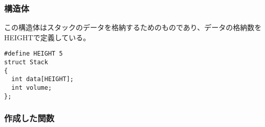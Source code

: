 \documentclass[dvipdfmx]{jsarticle}
\begin{document}
\subsubsection{構造体}
この構造体はスタックのデータを格納するためのものであり、データの格納数をHEIGHTで定義している。
\begin{lstlisting}[caption={stack.h}, label={lst:stackh}]
#define HEIGHT 5
struct Stack
{
  int data[HEIGHT];
  int volume;
};
\end{lstlisting}
\subsubsection{作成した関数}
\end{document}
